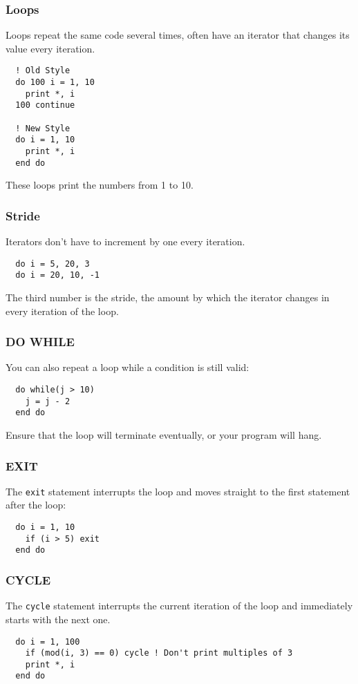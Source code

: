 \begin{frame}[fragile]
  \frametitle{Loops}

  Loops repeat the same code several times, often have an iterator that changes
  its value every iteration.

  \begin{lstlisting}
  ! Old Style
  do 100 i = 1, 10
    print *, i
  100 continue

  ! New Style
  do i = 1, 10
    print *, i
  end do
  \end{lstlisting}
  These loops print the numbers from 1 to 10.

\end{frame}

\begin{frame}[fragile]
  \frametitle{Stride}

  Iterators don't have to increment by one every iteration.

  \begin{lstlisting}
  do i = 5, 20, 3   
  do i = 20, 10, -1
  \end{lstlisting}
  The third number is the stride, the amount by which the iterator
  changes in every iteration of the loop.

\end{frame}

\begin{frame}[fragile]
  \frametitle{DO WHILE}

  You can also repeat a loop while a condition is still valid:

  \begin{lstlisting}
  do while(j > 10)
    j = j - 2
  end do
  \end{lstlisting}

  Ensure that the loop will terminate eventually, or your program will hang.

\end{frame}

\begin{frame}[fragile]
  \frametitle{EXIT}

  The \texttt{exit} statement interrupts the loop and moves straight to the first
  statement after the loop:

  \begin{lstlisting}
  do i = 1, 10
    if (i > 5) exit
  end do
  \end{lstlisting}

\end{frame}

\begin{frame}[fragile]
  \frametitle{CYCLE}

  The \texttt{cycle} statement interrupts the current iteration of the loop
  and immediately starts with the next one.

  \begin{lstlisting}
  do i = 1, 100
    if (mod(i, 3) == 0) cycle ! Don't print multiples of 3
    print *, i
  end do
  \end{lstlisting}

\end{frame}

